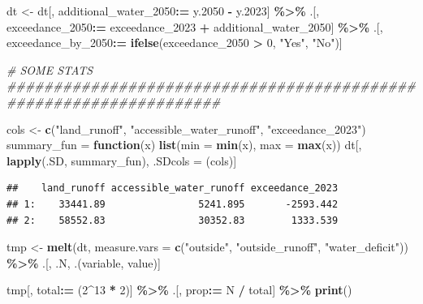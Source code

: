\documentclass[
  11pt,
]{article}
\newenvironment{Shaded}{\begin{snugshade}}{\end{snugshade}}
\newcommand{\AttributeTok}[1]{\textcolor[rgb]{0.13,0.29,0.53}{#1}}
\newcommand{\CommentTok}[1]{\textcolor[rgb]{0.56,0.35,0.01}{\textit{#1}}}
\newcommand{\ControlFlowTok}[1]{\textcolor[rgb]{0.13,0.29,0.53}{\textbf{#1}}}
\newcommand{\DecValTok}[1]{\textcolor[rgb]{0.00,0.00,0.81}{#1}}
\newcommand{\FloatTok}[1]{\textcolor[rgb]{0.00,0.00,0.81}{#1}}
\newcommand{\FunctionTok}[1]{\textcolor[rgb]{0.13,0.29,0.53}{\textbf{#1}}}
\newcommand{\NormalTok}[1]{#1}
\newcommand{\OtherTok}[1]{\textcolor[rgb]{0.56,0.35,0.01}{#1}}
\newcommand{\SpecialCharTok}[1]{\textcolor[rgb]{0.81,0.36,0.00}{\textbf{#1}}}
\newcommand{\StringTok}[1]{\textcolor[rgb]{0.31,0.60,0.02}{#1}}
\begin{document}
\begin{Shaded}
\begin{Highlighting}[]
\NormalTok{dt }\OtherTok{\textless{}{-}}\NormalTok{ dt[, additional\_water\_2050}\SpecialCharTok{:=}\NormalTok{ y}\FloatTok{.2050} \SpecialCharTok{{-}}\NormalTok{ y}\FloatTok{.2023}\NormalTok{] }\SpecialCharTok{\%\textgreater{}\%}
\NormalTok{  .[, exceedance\_2050}\SpecialCharTok{:=}\NormalTok{ exceedance\_2023 }\SpecialCharTok{+}\NormalTok{ additional\_water\_2050] }\SpecialCharTok{\%\textgreater{}\%}
\NormalTok{  .[, exceedance\_by\_2050}\SpecialCharTok{:=} \FunctionTok{ifelse}\NormalTok{(exceedance\_2050 }\SpecialCharTok{\textgreater{}} \DecValTok{0}\NormalTok{, }\StringTok{"Yes"}\NormalTok{, }\StringTok{"No"}\NormalTok{)]}

\CommentTok{\# SOME STATS \#\#\#\#\#\#\#\#\#\#\#\#\#\#\#\#\#\#\#\#\#\#\#\#\#\#\#\#\#\#\#\#\#\#\#\#\#\#\#\#\#\#\#\#\#\#\#\#\#\#\#\#\#\#\#\#\#\#\#\#\#\#\#\#\#\#\#}

\NormalTok{cols }\OtherTok{\textless{}{-}} \FunctionTok{c}\NormalTok{(}\StringTok{"land\_runoff"}\NormalTok{, }\StringTok{"accessible\_water\_runoff"}\NormalTok{, }\StringTok{"exceedance\_2023"}\NormalTok{)}
\NormalTok{summary\_fun }\OtherTok{=} \ControlFlowTok{function}\NormalTok{(x) }\FunctionTok{list}\NormalTok{(}\AttributeTok{min =} \FunctionTok{min}\NormalTok{(x), }\AttributeTok{max =} \FunctionTok{max}\NormalTok{(x))}
\NormalTok{dt[, }\FunctionTok{lapply}\NormalTok{(.SD, summary\_fun), .SDcols }\OtherTok{=}\NormalTok{ (cols)]}
\end{Highlighting}
\end{Shaded}

\begin{verbatim}
##    land_runoff accessible_water_runoff exceedance_2023
## 1:    33441.89                5241.895       -2593.442
## 2:    58552.83                30352.83        1333.539
\end{verbatim}

\begin{Shaded}
\begin{Highlighting}[]
\NormalTok{tmp }\OtherTok{\textless{}{-}} \FunctionTok{melt}\NormalTok{(dt, }\AttributeTok{measure.vars =} \FunctionTok{c}\NormalTok{(}\StringTok{"outside"}\NormalTok{, }\StringTok{"outside\_runoff"}\NormalTok{, }\StringTok{"water\_deficit"}\NormalTok{)) }\SpecialCharTok{\%\textgreater{}\%}
\NormalTok{  .[, .N, .(variable, value)]}

\NormalTok{tmp[, total}\SpecialCharTok{:=}\NormalTok{ (}\DecValTok{2}\SpecialCharTok{\^{}}\DecValTok{13} \SpecialCharTok{*} \DecValTok{2}\NormalTok{)] }\SpecialCharTok{\%\textgreater{}\%}
\NormalTok{  .[, prop}\SpecialCharTok{:=}\NormalTok{ N }\SpecialCharTok{/}\NormalTok{ total] }\SpecialCharTok{\%\textgreater{}\%}
  \FunctionTok{print}\NormalTok{()}
\end{Highlighting}
\end{Shaded}
\end{document}
